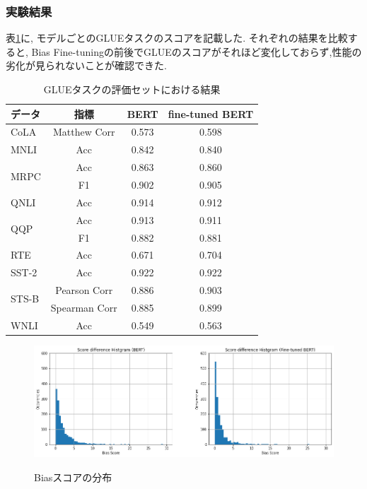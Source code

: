 \documentclass[
  platex, dvipdfmx %
]{nlp2021}
\begin{document}
\subsubsection{実験結果}
表\ref{tab:results_glue}に, モデルごとのGLUEタスクのスコアを記載した.
それぞれの結果を比較すると, Bias Fine-tuningの前後でGLUEのスコアがそれほど変化しておらず,性能の劣化が見られないことが確認できた.

\begin{table}[h]
\centering
\caption{GLUEタスクの評価セットにおける結果}
\label{tab:results_glue}
\begin{tabular}{lccc}
\hline
データ & 指標 &  BERT & fine-tuned BERT \\
\hline
CoLA & Matthew Corr & 0.573 &  0.598 \\
\hline
MNLI & Acc & 0.842 &  0.840  \\
\hline
\multirow{2}{*}{MRPC} & Acc & 0.863 &  0.860  \\
 & F1 & 0.902 & 0.905 \\
\hline
QNLI & Acc & 0.914 & 0.912 \\
\hline
\multirow{2}{*}{QQP} & Acc & 0.913 & 0.911 \\
 & F1 & 0.882 & 0.881 \\
\hline
RTE & Acc & 0.671 & 0.704 \\
\hline
SST-2 & Acc & 0.922 & 0.922 \\
\hline
\multirow{2}{*}{STS-B} & Pearson Corr & 0.886 & 0.903\\
 & Spearman Corr & 0.885 & 0.899\\
\hline
WNLI & Acc & 0.549 & 0.563 \\
\hline
\end{tabular}
\end{table}

\begin{figure}[h]
\centering
\caption{Biasスコアの分布}
\includegraphics[width=15cm]{hist_score_diffrerence.png}
\label{fig:hist_bias}
\end{figure}
\end{document}
